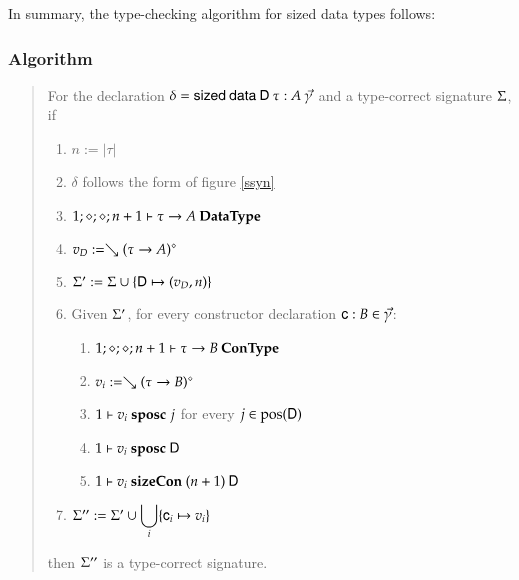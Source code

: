 \noindent In summary, the type-checking algorithm for sized data types follows: 
\subsubsection{Algorithm}
\begin{quote}
For the declaration $\delta = \mathsf{sized}\: \mathsf{data}\: \mathsf{D} \: \tau : A \: \vec{\gamma} $ 
and a type-correct signature $\Sigma$, if
\begin{enumerate}
\item
$ n := \vert\tau\vert$
\item
$\delta$ follows the form of figure \ref{ssyn}
\item
$1;\diamond;\diamond;n+1\vdash\tau \rightarrow A\:\mathbf{DataType}$
\item
$v_D := \searrow (\tau \rightarrow A)^{\diamond}$
\item
$\Sigma' := \Sigma \cup \{\mathsf{D} \mapsto (v_D,n)\}$
\item
Given $\Sigma'$, for every constructor declaration $\mathsf{c} : B  \in \vec{\gamma}$:
\begin{enumerate} 
\item
$1;\diamond;\diamond;n+1\vdash\tau \rightarrow B\:\mathbf{ConType}$
\item
$v_i := \searrow (\tau \rightarrow B)^{\diamond}$
\item
$1\vdash v_i\mbox{ \textbf{sposc} }j$ for every $j \in \mbox{pos}(\mathsf{D}) $ 
\item
$1\vdash v_i\mbox{ \textbf{sposc} }\mathsf{D}$
\item
$1\vdash v_i\mbox{ \textbf{sizeCon} }(n+1)\:\mathsf{D}$
\end{enumerate}
\item
$\Sigma'' := \Sigma' \cup \displaystyle\bigcup_{i}\{\mathsf{c}_i \mapsto v_i\}$
\end{enumerate}
then $\Sigma''$ is a type-correct signature.
\end{quote}


